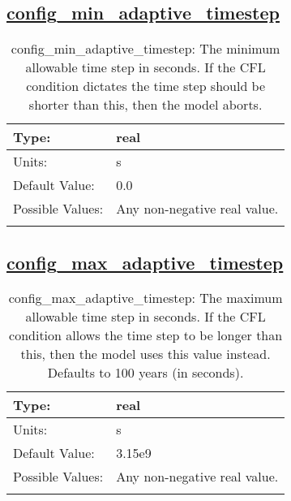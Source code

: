 \subsection[config\_min\_adaptive\_timestep]{\hyperref[sec:nm_tab_time_integration]{config\_min\_adaptive\_timestep}}
\label{subsec:nm_sec_config_min_adaptive_timestep}
\begin{center}
\begin{longtable}{| p{2.0in} || p{4.0in} |}
    \hline
    Type: & real \\
    \hline
    Units: & \si{s} \\
    \hline
    Default Value: & 0.0 \\
    \hline
    Possible Values: & Any non-negative real value. \\
    \hline
    \caption{config\_min\_adaptive\_timestep: The minimum allowable time step in seconds.  If the CFL condition dictates the time step should be shorter than this, then the model aborts.}
\end{longtable}
\end{center}
\subsection[config\_max\_adaptive\_timestep]{\hyperref[sec:nm_tab_time_integration]{config\_max\_adaptive\_timestep}}
\label{subsec:nm_sec_config_max_adaptive_timestep}
\begin{center}
\begin{longtable}{| p{2.0in} || p{4.0in} |}
    \hline
    Type: & real \\
    \hline
    Units: & \si{s} \\
    \hline
    Default Value: & 3.15e9 \\
    \hline
    Possible Values: & Any non-negative real value. \\
    \hline
    \caption{config\_max\_adaptive\_timestep: The maximum allowable time step in seconds.  If the CFL condition allows the time step to be longer than this, then the model uses this value instead.  Defaults to 100 years (in seconds).}
\end{longtable}
\end{center}
